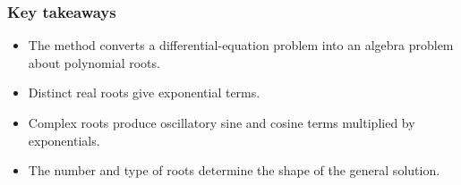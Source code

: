 \subsubsection*{Key takeaways}
\begin{itemize}[leftmargin=*]
  \item The method converts a differential-equation problem into an algebra problem about polynomial roots.
  \item Distinct real roots give exponential terms.
  \item Complex roots produce oscillatory sine and cosine terms multiplied by exponentials.
  \item The number and type of roots determine the shape of the general solution.
\end{itemize}
